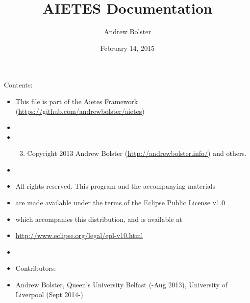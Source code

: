 \documentclass[letterpaper,10pt,english]{sphinxmanual}
\title{AIETES Documentation}
\date{February 14, 2015}
\author{Andrew Bolster}
\begin{document}
\maketitle
\tableofcontents
{}\label{index::doc}


Contents:
\label{index:module-aietes}\begin{itemize}
\item {} 
This file is part of the Aietes Framework (\href{https://github.com/andrewbolster/aietes}{https://github.com/andrewbolster/aietes})

\item {} 
\item {} \begin{enumerate}
\setcounter{enumi}{2}
\item {} 
Copyright 2013 Andrew Bolster (\href{http://andrewbolster.info/}{http://andrewbolster.info/}) and others.

\end{enumerate}

\item {} 
\item {} 
All rights reserved. This program and the accompanying materials

\item {} 
are made available under the terms of the Eclipse Public License v1.0

\item {} 
which accompanies this distribution, and is available at

\item {} 
\href{http://www.eclipse.org/legal/epl-v10.html}{http://www.eclipse.org/legal/epl-v10.html}

\item {} 
\item {} 
Contributors:

\item {} 
Andrew Bolster, Queen's University Belfast (-Aug 2013), University of Liverpool (Sept 2014-)

\end{itemize}
\end{document}
